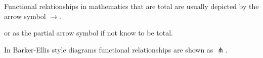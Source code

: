 \mynote Functional relationships in mathematics that are total are usually depicted by the arrow symbol $\longrightarrow$.

or as the partial arrow symbol if not know to be total. 

\mynote In Barker-Ellis style diagrams functional relationships are shown as 
$\pitchfork$.